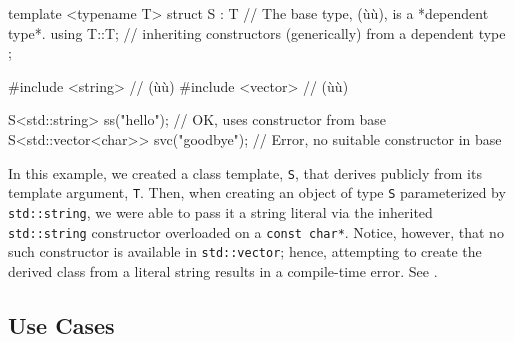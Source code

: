 \begin{emcppslisting}
template <typename T>
struct S : T  // The base type, (ù{}ù), is a *dependent type*.
{
    using T::T;  // inheriting constructors (generically) from a dependent type
};

#include <string>   // (ù{}ù)
#include <vector>   // (ù{}ù)

S<std::string>        ss("hello");    // OK, uses constructor from base
S<std::vector<char>> svc("goodbye");  // Error, no suitable constructor in base
\end{emcppslisting}
    
\noindent In this example, we created a class template, \lstinline!S!, that
derives publicly from its template argument, \lstinline!T!. Then, when
creating an object of type \lstinline!S! parameterized by
\lstinline!std::string!, we were able to pass it a string literal via
the inherited \lstinline!std::string! constructor overloaded on a
\lstinline!const!~\lstinline!char*!. Notice, however, that no such constructor
is available in \lstinline!std::vector!; hence, attempting to create the
derived class from a literal string results in a compile-time error. See . 

\subsection[Use Cases]{Use Cases}\label{use-cases-ctorinheriting}
\label{abstract-use-case}

